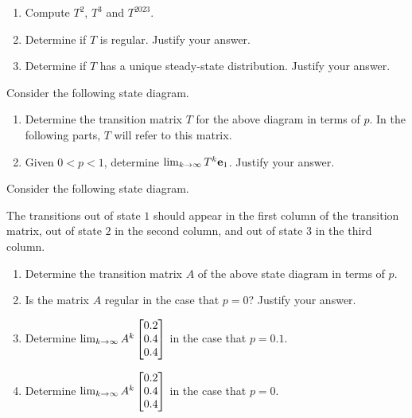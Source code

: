 \begin{tasks}[resume, style=enumerate]
\begin{enumerate}[label=(\alph*)]
  \item
    Compute $T^2$, $T^3$ and $T^{2023}$.
  \item
    Determine if $T$ is regular. Justify your answer.
  \item
    Determine if $T$ has a unique steady-state distribution.  Justify
    your answer.
  \end{enumerate}
\task
  Consider the following state diagram.
  \begin{center}
  \end{center}
  \begin{enumerate}[label=(\alph*)]
  \item
    Determine the transition matrix $T$ for the above diagram in terms
    of $p$.  In the following parts, $T$ will refer to this matrix.
  \item
    Given $0 < p < 1$, determine $\lim_{k \to \infty} T^k \mathbf e_1$.
    Justify your answer.
  \end{enumerate}
\task
  Consider the following state diagram.
  \begin{center}
  \end{center}
  The transitions out of state $1$ should appear in the first column
  of the transition matrix, out of state $2$ in the second column,
  and out of state $3$ in the third column.
  \begin{enumerate}[label=(\alph*)]
  \item
    Determine the transition matrix $A$ of the above state diagram in
    terms of $p$.
  \item
    Is the matrix $A$ regular in the case that $p = 0$?  Justify your
    answer.
  \item
    Determine $\lim_{k \to \infty} A^k  \begin{bmatrix} 0.2 \\ 0.4 \\ 0.4 \end{bmatrix} $ in
    the case that $p = 0.1$.
  \item
    Determine $\lim_{k \to \infty} A^k  \begin{bmatrix} 0.2 \\ 0.4 \\ 0.4 \end{bmatrix} $ in
    the case that $p = 0$.
  \end{enumerate}
\end{tasks}

